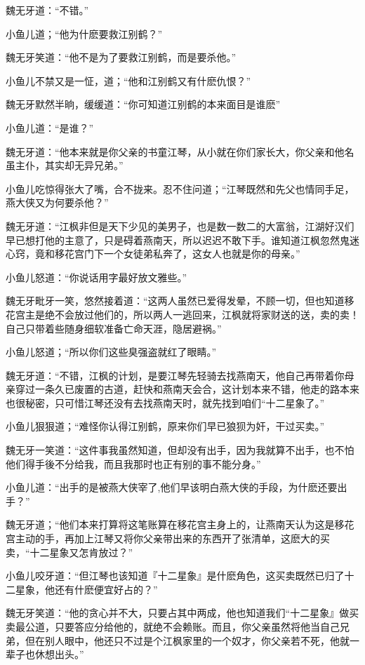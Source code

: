 \documentclass[12pt,oneside]{book}
\begin{document}
魏无牙道：``不错。''

小鱼儿道；``他为什麽要救江别鹤？''

魏无牙笑道：``他不是为了要救江别鹤，而是要杀他。''

小鱼儿不禁又是一怔，道；``他和江别鹤又有什麽仇恨？''

魏无牙默然半晌，缓缓道：``你可知道江别鹤的本来面目是谁麽''

小鱼儿道：``是谁？''

魏无牙道：``他本来就是你父亲的书童江琴，从小就在你们家长大，你父亲和他名虽主仆，其实却无异兄弟。''

小鱼儿吃惊得张大了嘴，合不拢来。忍不住问道；``江琴既然和先父也情同手足，燕大侠又为何要杀他？''

魏无牙道：``江枫非但是天下少见的美男子，也是数一数二的大富翁，江湖好汉们早已想打他的主意了，只是碍着燕南天，所以迟迟不敢下手。谁知道江枫忽然鬼迷心窍，竟和移花宫门下一个女徒弟私奔了，这女人也就是你的母亲。''

小鱼儿怒道：``你说话用字最好放文雅些。''

魏无牙毗牙一笑，悠然接着道：``这两人虽然已爱得发晕，不顾一切，但也知道移花宫主是绝不会放过他们的，所以两人一逃回来，江枫就将家财送的送，卖的卖！自己只带着些随身细软准备亡命天涯，隐居避祸。''

小鱼儿怒道；``所以你们这些臭强盗就红了眼睛。''

魏无牙道：``不错，江枫的计划，是要江琴先轻骑去找燕南天，他自己再带着你母亲穿过一条久已废置的古道，赶快和燕南天会合，这计划本来不错，他走的路本来也很秘密，只可惜江琴还没有去找燕南天时，就先找到咱们``十二星象了。''

小鱼儿狠狠道；``难怪你认得江别鹤，原来你们早已狼狈为奸，干过买卖。''

魏无牙一笑道：``这件事我虽然知道，但却没有出手，因为我就算不出手，也不怕他们得手後不分给我，而且我那时也正有别的事不能分身。''

小鱼儿道：``出手的是被燕大侠宰了,他们早该明白燕大侠的手段，为什麽还要出手？''

魏无牙道；``他们本来打算将这笔账算在移花宫主身上的，让燕南天认为这是移花宫主动的手，再加上江琴又将你父亲带出来的东西开了张清单，这麽大的买卖，``十二星象又怎肯放过？''

小鱼儿咬牙道：``但江琴也该知道『十二星象』是什麽角色，这买卖既然已归了十二星象，他还有什麽便宜好占的？''

魏无牙笑道：``他的贪心并不大，只要占其中两成，他也知道我们``十二星象』做买卖最公道，只要答应分给他的，就绝不会赖账。而且，你父亲虽然将他当自己兄弟，但在别人眼中，他还只不过是个江枫家里的一个奴才，你父亲若不死，他就一辈子也休想出头。''
\end{document}
